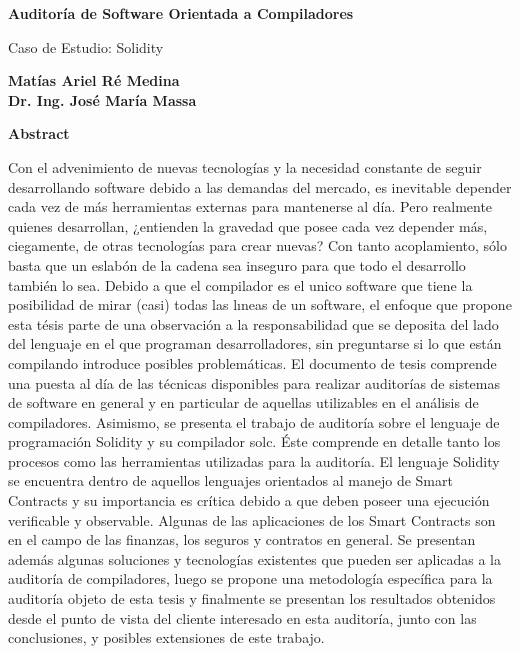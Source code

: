 \thispagestyle{plain}
\begin{center}
    \Large
    \textbf{Auditoría de Software Orientada a Compiladores}

    \vspace{0.2cm}
    \large
    {Caso de Estudio: Solidity}
 
    \vspace{0.4cm}
    \textbf{{Matías Ariel Ré Medina}\\
    {Dr. Ing. José María Massa}
    }
 
    \vspace{0.9cm}
    \textbf{Abstract}
\end{center}


Con el advenimiento de nuevas tecnologías y la necesidad constante de seguir desarrollando software debido a las demandas del mercado, es inevitable depender cada vez de más herramientas externas para mantenerse al día. Pero realmente quienes desarrollan, ¿entienden la gravedad que posee cada vez depender más, ciegamente, de otras tecnologías para crear nuevas? Con tanto acoplamiento, sólo basta que un eslabón de la cadena sea inseguro para que todo el desarrollo también lo sea. Debido a que el compilador es el unico software que tiene la posibilidad de mirar (casi) todas las lıneas de un software, el enfoque que propone esta tésis parte de una observación a la responsabilidad que se deposita del lado del lenguaje en el que programan desarrolladores, sin preguntarse si lo que están compilando introduce posibles problemáticas. El documento de tesis comprende una puesta al día de las técnicas disponibles para realizar auditorías de sistemas de software en general y en particular de aquellas utilizables en el análisis de compiladores. Asimismo, se presenta el trabajo de auditoría sobre el lenguaje de programación Solidity y su compilador solc. Éste comprende en detalle tanto los procesos como las herramientas utilizadas para la auditoría. El lenguaje Solidity se encuentra dentro de aquellos lenguajes orientados al manejo de Smart Contracts y su importancia es crítica debido a que deben poseer una ejecución verificable y observable. Algunas de las aplicaciones de los Smart Contracts son en el campo de las finanzas, los seguros  y contratos en general. Se presentan además algunas soluciones y tecnologías existentes que pueden ser aplicadas a la auditoría de compiladores, luego se propone una metodología específica para la auditoría objeto de esta tesis y finalmente se presentan los resultados obtenidos desde el punto de vista del cliente interesado en esta auditoría, junto con las conclusiones, y posibles extensiones de este trabajo.